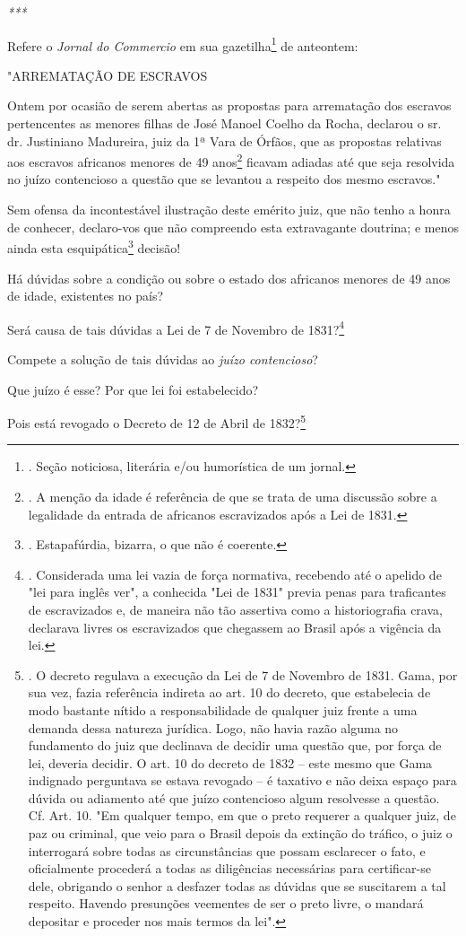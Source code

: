 \emph{***}

Refere o \emph{Jornal do Commercio} em sua gazetilha\footnote{. Seção
  noticiosa, literária e/ou humorística de um jornal.} de anteontem:

"ARREMATAÇÃO DE ESCRAVOS

Ontem por ocasião de serem abertas as propostas para arrematação dos
escravos pertencentes as menores filhas de José Manoel Coelho da Rocha,
declarou o sr. dr. Justiniano Madureira, juiz da 1ª Vara de Órfãos, que
as propostas relativas aos escravos africanos menores de 49
anos\footnote{. A menção da idade é referência de que se trata de uma
  discussão sobre a legalidade da entrada de africanos escravizados após
  a Lei de 1831.} ficavam adiadas até que seja resolvida no juízo
contencioso a questão que se levantou a respeito dos mesmo escravos."

Sem ofensa da incontestável ilustração deste emérito juiz, que não tenho
a honra de conhecer, declaro-vos que não compreendo esta extravagante
doutrina; e menos ainda esta esquipática\footnote{. Estapafúrdia,
  bizarra, o que não é coerente.} decisão!

Há dúvidas sobre a condição ou sobre o estado dos africanos menores de
49 anos de idade, existentes no país?

Será causa de tais dúvidas a Lei de 7 de Novembro de 1831?\footnote{.
  Considerada uma lei vazia de força normativa, recebendo até o apelido
  de "lei para inglês ver", a conhecida "Lei de 1831" previa penas para
  traficantes de escravizados e, de maneira não tão assertiva como a
  historiografia crava, declarava livres os escravizados que chegassem
  ao Brasil após a vigência da lei.}

Compete a solução de tais dúvidas ao \emph{juízo contencioso}?

Que juízo é esse? Por que lei foi estabelecido?

Pois está revogado o Decreto de 12 de Abril de 1832?\footnote{. O
  decreto regulava a execução da Lei de 7 de Novembro de 1831. Gama, por
  sua vez, fazia referência indireta ao art. 10 do decreto, que
  estabelecia de modo bastante nítido a responsabilidade de qualquer
  juiz frente a uma demanda dessa natureza jurídica. Logo, não havia
  razão alguma no fundamento do juiz que declinava de decidir uma
  questão que, por força de lei, deveria decidir. O art. 10 do decreto
  de 1832 -- este mesmo que Gama indignado perguntava se estava revogado
  -- é taxativo e não deixa espaço para dúvida ou adiamento até que
  juízo contencioso algum resolvesse a questão. Cf. Art. 10. "Em
  qualquer tempo, em que o preto requerer a qualquer juiz, de paz ou
  criminal, que veio para o Brasil depois da extinção do tráfico, o juiz
  o interrogará sobre todas as circunstâncias que possam esclarecer o
  fato, e oficialmente procederá a todas as diligências necessárias para
  certificar-se dele, obrigando o senhor a desfazer todas as dúvidas que
  se suscitarem a tal respeito. Havendo presunções veementes de ser o
  preto livre, o mandará depositar e proceder nos mais termos da lei".}

